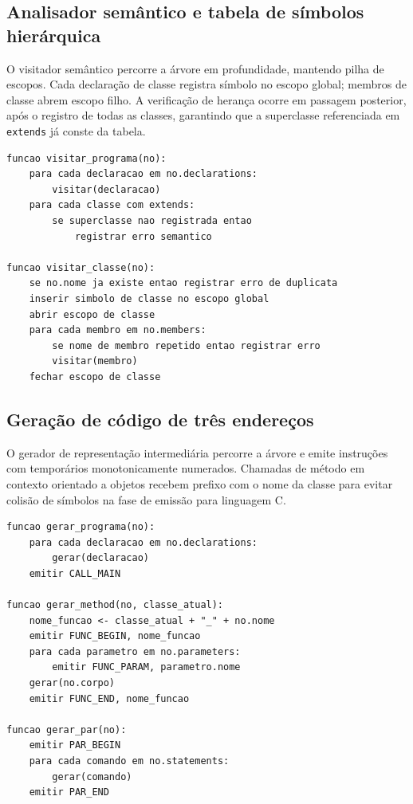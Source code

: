 \subsection{Analisador semântico e tabela de símbolos hierárquica}

O visitador semântico percorre a árvore em profundidade, mantendo pilha de escopos. Cada declaração de classe registra símbolo no escopo global; membros de classe abrem escopo filho. A verificação de herança ocorre em passagem posterior, após o registro de todas as classes, garantindo que a superclasse referenciada em \texttt{extends} já conste da tabela.

\begin{lstlisting}[caption={Pseudocodigo do visitador semantico}]
funcao visitar_programa(no):
    para cada declaracao em no.declarations:
        visitar(declaracao)
    para cada classe com extends:
        se superclasse nao registrada entao
            registrar erro semantico

funcao visitar_classe(no):
    se no.nome ja existe entao registrar erro de duplicata
    inserir simbolo de classe no escopo global
    abrir escopo de classe
    para cada membro em no.members:
        se nome de membro repetido entao registrar erro
        visitar(membro)
    fechar escopo de classe
\end{lstlisting}

\subsection{Geração de código de três endereços}

O gerador de representação intermediária percorre a árvore e emite instruções com temporários monotonicamente numerados. Chamadas de método em contexto orientado a objetos recebem prefixo com o nome da classe para evitar colisão de símbolos na fase de emissão para linguagem C.

\begin{lstlisting}[caption={Pseudocodigo de lowering para TAC}]
funcao gerar_programa(no):
    para cada declaracao em no.declarations:
        gerar(declaracao)
    emitir CALL_MAIN

funcao gerar_method(no, classe_atual):
    nome_funcao <- classe_atual + "_" + no.nome
    emitir FUNC_BEGIN, nome_funcao
    para cada parametro em no.parameters:
        emitir FUNC_PARAM, parametro.nome
    gerar(no.corpo)
    emitir FUNC_END, nome_funcao

funcao gerar_par(no):
    emitir PAR_BEGIN
    para cada comando em no.statements:
        gerar(comando)
    emitir PAR_END
\end{lstlisting}

